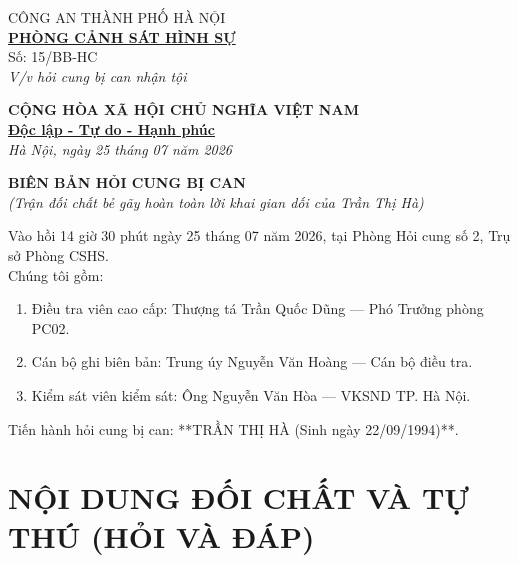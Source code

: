 \documentclass[12pt,a4paper]{article}
\begin{document}
\noindent
\begin{minipage}[t]{0.45\textwidth}
    \begin{center}
        \small
        CÔNG AN THÀNH PHỐ HÀ NỘI\\
        \textbf{\underline{PHÒNG CẢNH SÁT HÌNH SỰ}}\\[0.1cm]
        Số: 15/BB-HC\\
        \textit{V/v hỏi cung bị can nhận tội}
    \end{center}
\end{minipage}
\hfill
\begin{minipage}[t]{0.52\textwidth}
    \begin{center}
        \small
        \textbf{CỘNG HÒA XÃ HỘI CHỦ NGHĨA VIỆT NAM}\\
        \textbf{\underline{Độc lập - Tự do - Hạnh phúc}}\\[0.1cm]
        \textit{Hà Nội, ngày 25 tháng 07 năm 2026}
    \end{center}
\end{minipage}

\vspace{0.6cm}

\begin{center}
    \textbf{\large BIÊN BẢN HỎI CUNG BỊ CAN}\\
    \textit{(Trận đối chất bẻ gãy hoàn toàn lời khai gian dối của Trần Thị Hà)}
\end{center}

\vspace{0.3cm}

\noindent Vào hồi 14 giờ 30 phút ngày 25 tháng 07 năm 2026, tại Phòng Hỏi cung số 2, Trụ sở Phòng CSHS.\\
Chúng tôi gồm:
\begin{enumerate}[label=\arabic*., leftmargin=1.5cm]
    \item Điều tra viên cao cấp: Thượng tá Trần Quốc Dũng — Phó Trưởng phòng PC02.
    \item Cán bộ ghi biên bản: Trung úy Nguyễn Văn Hoàng — Cán bộ điều tra.
    \item Kiểm sát viên kiểm sát: Ông Nguyễn Văn Hòa — VKSND TP. Hà Nội.
\end{enumerate}

\noindent Tiến hành hỏi cung bị can: **TRẦN THỊ HÀ (Sinh ngày 22/09/1994)**.

\section*{NỘI DUNG ĐỐI CHẤT VÀ TỰ THÚ (HỎI VÀ ĐÁP)}
\end{document}
